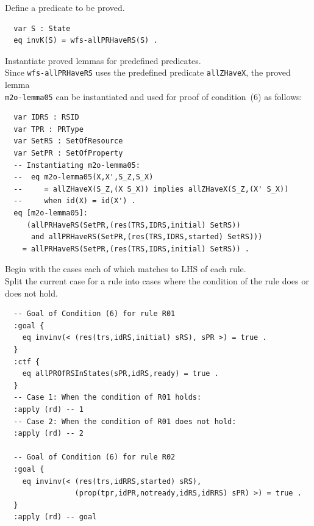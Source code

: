 \documentclass[12pt]{report}
\begin{document}
 Define a predicate to be proved. 
\small
\begin{verbatim}
  var S : State
  eq invK(S) = wfs-allPRHaveRS(S) .
\end{verbatim}
\normalsize

 Instantiate proved lemmas for predefined
predicates. \\ Since {\tt wfs-allPRHaveRS} uses the predefined
predicate {\tt allZHaveX}, the proved lemma \\ {\tt m2o-lemma05} can be
instantiated and used for proof of condition~(6) as
follows:
\small
\begin{verbatim}
  var IDRS : RSID 
  var TPR : PRType
  var SetRS : SetOfResource
  var SetPR : SetOfProperty
  -- Instantiating m2o-lemma05:
  --  eq m2o-lemma05(X,X',S_Z,S_X) 
  --     = allZHaveX(S_Z,(X S_X)) implies allZHaveX(S_Z,(X' S_X))
  --     when id(X) = id(X') .
  eq [m2o-lemma05]:
     (allPRHaveRS(SetPR,(res(TRS,IDRS,initial) SetRS))
      and allPRHaveRS(SetPR,(res(TRS,IDRS,started) SetRS)))
    = allPRHaveRS(SetPR,(res(TRS,IDRS,initial) SetRS)) .
\end{verbatim}
\normalsize

 Begin with the cases each of which matches to
LHS of each rule. \\ 
 Split the current case for a rule into
cases where the condition of the rule does or does not hold. 
\small
\begin{verbatim}
  -- Goal of Condition (6) for rule R01
  :goal {
    eq invinv(< (res(trs,idRS,initial) sRS), sPR >) = true .
  }
  :ctf {
    eq allPROfRSInStates(sPR,idRS,ready) = true .
  }
  -- Case 1: When the condition of R01 holds:
  :apply (rd) -- 1
  -- Case 2: When the condition of R01 does not hold:
  :apply (rd) -- 2

  -- Goal of Condition (6) for rule R02
  :goal {
    eq invinv(< (res(trs,idRRS,started) sRS),
                (prop(tpr,idPR,notready,idRS,idRRS) sPR) >) = true .
  }
  :apply (rd) -- goal
\end{verbatim}
\normalsize
\end{document}
